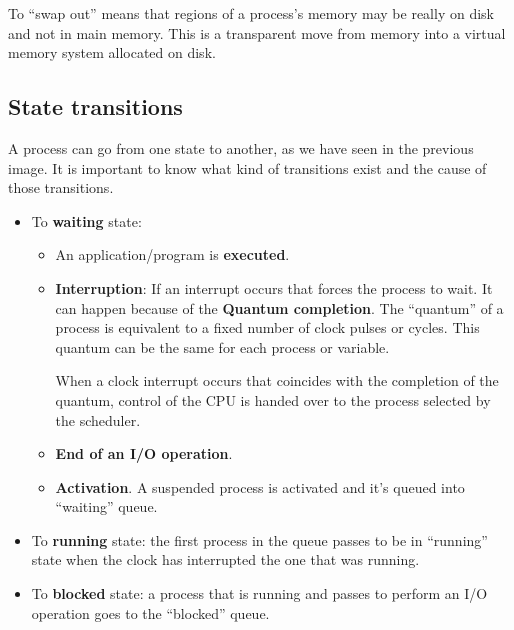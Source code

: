 To “swap out” means that regions of a process's memory may be really on disk and not in main memory. This is a transparent move from memory into a virtual memory system allocated on disk.


\subsection{State transitions}

A process can go from one state to another, as we have seen in the previous image. It is important to know what kind of transitions exist and the cause of those transitions.

\begin{itemize}


    \item To \textbf{waiting} state:
    \begin{itemize}
        \item An application/program is \textbf{executed}.

        \hypertarget{quantum}{}
        \item \textbf{Interruption}: If an interrupt occurs that forces the process to wait. It can happen because of the \textbf{Quantum completion}. The “quantum” of a process is equivalent to a fixed number of clock pulses or cycles. This quantum can be the same for each process or variable.

        When a clock interrupt occurs that coincides with the completion of the quantum, control of the CPU is handed over to the process selected by the scheduler.

        \item \textbf{End of an I/O operation}.

        \item \textbf{Activation}. A suspended process is activated and it's queued into “waiting” queue.
    \end{itemize}

    \item To \textbf{running} state: the first process in the queue passes
    to be in “running” state when the clock has interrupted the one that was running.

    \item To \textbf{blocked} state: a process that is running and passes to
    perform an I/O operation goes to the “blocked” queue.
\end{itemize}

